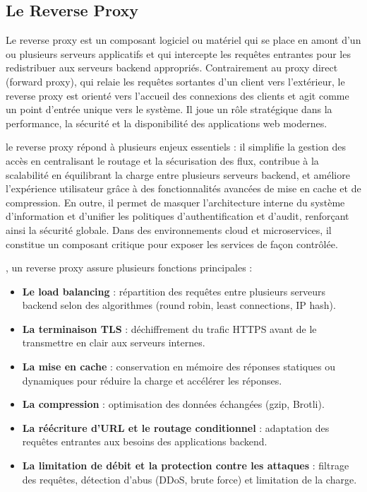 \subsection{Le Reverse Proxy}

Le reverse proxy est un composant logiciel ou matériel qui se place en amont d’un ou plusieurs serveurs applicatifs et qui intercepte les requêtes entrantes pour les redistribuer aux serveurs backend appropriés. Contrairement au proxy direct (forward proxy), qui relaie les requêtes sortantes d’un client vers l’extérieur, le reverse proxy est orienté vers l’accueil des connexions des clients et agit comme un point d’entrée unique vers le système. Il joue un rôle stratégique dans la performance, la sécurité et la disponibilité des applications web modernes.

 le reverse proxy répond à plusieurs enjeux essentiels  : il simplifie la gestion des accès en centralisant le routage et la sécurisation des flux, contribue à la scalabilité en équilibrant la charge entre plusieurs serveurs backend, et améliore l’expérience utilisateur grâce à des fonctionnalités avancées de mise en cache et de compression. En outre, il permet de masquer l’architecture interne du système d’information et d’unifier les politiques d’authentification et d’audit, renforçant ainsi la sécurité globale. Dans des environnements cloud et microservices, il constitue un composant critique pour exposer les services de façon contrôlée.

, un reverse proxy assure plusieurs fonctions principales :
\begin{itemize}
	\item \textbf{Le load balancing}  : répartition des requêtes entre plusieurs serveurs backend selon des algorithmes (round robin, least connections, IP hash).
	\item \textbf{La terminaison TLS}  : déchiffrement du trafic HTTPS avant de le transmettre en clair aux serveurs internes.
	\item \textbf{La mise en cache}  : conservation en mémoire des réponses statiques ou dynamiques pour réduire la charge et accélérer les réponses.
	\item \textbf{La compression}  : optimisation des données échangées (gzip, Brotli).
	\item \textbf{La réécriture d’URL et le routage conditionnel}  : adaptation des requêtes entrantes aux besoins des applications backend.
	\item \textbf{La limitation de débit et la protection contre les attaques}  : filtrage des requêtes, détection d’abus (DDoS, brute force) et limitation de la charge.
\end{itemize}

